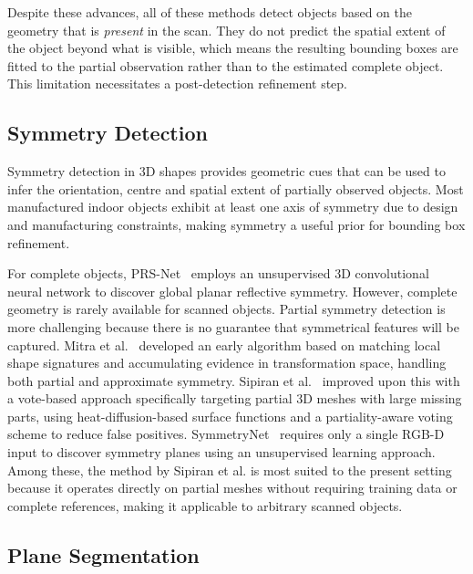 Despite these advances, all of these methods detect objects based on the geometry that is \textit{present} in the scan. They do not predict the spatial extent of the object beyond what is visible, which means the resulting bounding boxes are fitted to the partial observation rather than to the estimated complete object. This limitation necessitates a post-detection refinement step.


\subsection{Symmetry Detection}
\label{sec:5_rw_symmetry}
Symmetry detection in 3D shapes provides geometric cues that can be used to infer the orientation, centre and spatial extent of partially observed objects. Most manufactured indoor objects exhibit at least one axis of symmetry due to design and manufacturing constraints, making symmetry a useful prior for bounding box refinement.

For complete objects, PRS-Net~\cite{gao_prs-net_2019} employs an unsupervised 3D convolutional neural network to discover global planar reflective symmetry. However, complete geometry is rarely available for scanned objects. Partial symmetry detection is more challenging because there is no guarantee that symmetrical features will be captured. Mitra et al.~\cite{mitra_partial_2006} developed an early algorithm based on matching local shape signatures and accumulating evidence in transformation space, handling both partial and approximate symmetry. Sipiran et al.~\cite{sipiran_approximate_2014} improved upon this with a vote-based approach specifically targeting partial 3D meshes with large missing parts, using heat-diffusion-based surface functions and a partiality-aware voting scheme to reduce false positives. SymmetryNet~\cite{shi_symmetrynet_2020} requires only a single RGB-D input to discover symmetry planes using an unsupervised learning approach. Among these, the method by Sipiran et al. is most suited to the present setting because it operates directly on partial meshes without requiring training data or complete references, making it applicable to arbitrary scanned objects.


\subsection{Plane Segmentation}
\label{sec:5_rw_planes}

